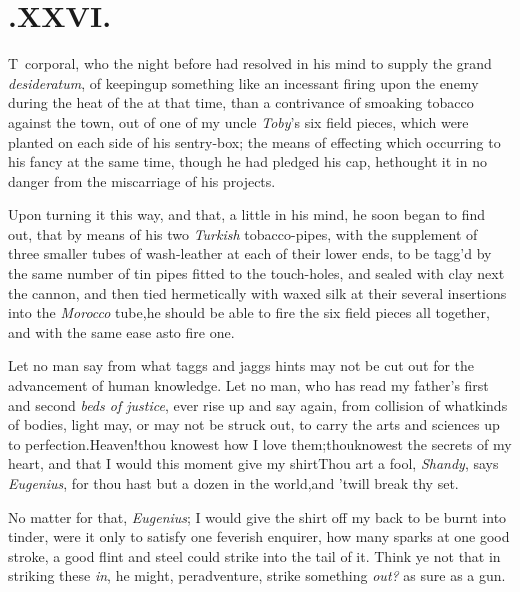 \documentclass{article}
\begin{document}
\section{.\enspace XXVI.}

\lettrine{T}{\,} corporal, who the night before
had resolved in his mind to
supply the grand \textit{desideratum}, of keeping\break up something like an incessant
firing upon the enemy during the heat of the  at that time, than a contrivance of smoaking tobacco against the town, out of
one of my uncle \textit{Toby}’s six field pieces, which were planted on each side of
his sentry-box; the means of effecting which occurring to his fancy at the same
time, though he had pledged his cap, he\pb thought it in no danger from the miscarriage
of his projects.

Upon turning it this way, and that, a little in his mind, he
soon began to find out, that by means of his two \textit{Turkish}
tobacco-pipes, with the supplement of three smaller tubes of
wash-leather at each of their lower ends, to be tagg’d by the
same number of tin pipes fitted to the touch-holes, and sealed with
clay next the cannon, and then tied hermetically with waxed silk at
their several insertions into the \textit{Morocco} tube,\tsk he
should be able to fire the six field pieces all together, and with
the same ease as\break to fire one.\tsh 

\enlargethispage{2\baselineskip}
\tsh Let no man say from what taggs and jaggs hints may
not be cut out for the advancement of human knowledge. Let no man, who
has read my father’s first and second \textit{beds of justice},
ever rise up and say again, from collision of what\pb kinds of bodies,
light may, or may not be struck out, to carry the arts and sciences
up to perfection.\tsh Heaven!\break thou knowest how I love
them;\tsk thou\break knowest the secrets of my heart, and that I
would this moment give my shirt\break\tsh Thou art a fool,
\textit{Shandy}, says \textit{Eu\-genius}, for thou hast but a dozen in
the world,\tsk and ’twill break thy set.\tsh

No matter for that, \textit{Eugenius}; I would give the shirt off
my back to be burnt into tinder, were it only to satisfy one
feverish enquirer, how many sparks at one good stroke, a good flint
and steel could strike into the tail of it.\tsh\break
Think ye not that in striking these \textit{in},\tsk\break
he might, peradventure, strike something \textit{out?} as sure as a
gun.\tsh
\end{document}
